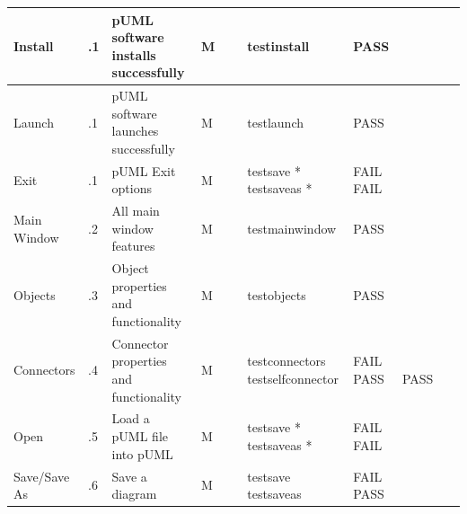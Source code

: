 \documentclass[twoside,letterpaper]{article}
\begin{document}
{\begin{landscape}
\begin{flushleft}
\begin{supertabular}[c]{|
                        m{0.9in}|m{0.4in}|m{2.0in}|
                        m{0.4in}|m{0.5in}|m{1.0in}|
                        m{1.0in}|m{1.0in}|c|
                       }
  Install
  & .1
  & pUML software installs successfully
  & \centering M 
  & ~
  & testinstall
  & PASS
  & ~ 
  & ~ 
\\\hline

  Launch
  & .1
  & pUML software launches successfully
  & \centering M 
  & ~
  & testlaunch
  & PASS
  & ~ 
  & ~ 
\\\hline

  Exit
  & .1
  & pUML Exit options 
  & \centering M 
  & ~
  & testsave *\newline
    testsaveas *
  & FAIL \newline
    FAIL 
  & ~ \newline
    ~
  & ~ \newline
    ~
\\\hline

  Main Window
  & .2
  & All main window features 
  & \centering M 
  & ~
  & testmainwindow 
  & PASS
  & ~ 
  & ~ 
\\\hline

  Objects
  & .3
  & Object properties and functionality
  & \centering M 
  & ~ 
  & testobjects
  & PASS
  & ~ 
  & ~ 
\\\hline

  Connectors
  & .4
  & Connector properties and functionality
  & \centering M 
  & ~ 
  & testconnectors\newline 
    testselfconnector
  & FAIL \newline
    PASS
  & ~ \newline
    PASS
  & ~ \newline
    ~
\\\hline

  Open
  & .5
  & Load a pUML file into pUML 
  & \centering M 
  & ~ 
  & testsave *\newline
    testsaveas *
  & FAIL \newline
    FAIL 
  & ~ \newline
    ~
  & ~ \newline
    ~
\\\hline

  Save/Save As
  & .6
  & Save a diagram 
  & \centering M 
  & ~ 
  & testsave \newline 
    testsaveas
  & FAIL \newline
    PASS
  & ~ \newline
    ~
  & ~ \newline
    ~
\\\hline


\end{supertabular}
\end{flushleft}
\end{landscape}}
\end{document}
